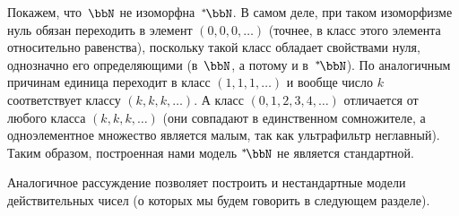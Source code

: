Покажем, что~$\bbN$ не изоморфна~$\nstbb{\bbN}$. В самом деле, при
таком изоморфизме нуль обязан переходить в элемент
$(0,0,0,\dots)$ (точнее, в класс этого элемента относительно
равенства), поскольку такой класс обладает свойствами нуля,
однозначно его определяющими (в~$\bbN$, а потому и
в~$\nstbb{\bbN}$). По аналогичным причинам единица переходит в
класс $(1,1,1,\dots)$ и вообще число $k$ соответствует классу
$(k,k,k,\dots)$. А класс $(0,1,2,3,4,\dots)$ отличается от любого
класса $(k,k,k,\dots)$ (они совпадают в единственном сомножителе,
а одноэлементное множество является малым, так как ультрафильтр
неглавный). Таким образом, построенная нами модель $\nstbb{\bbN}$
не является стандартной.

Аналогичное рассуждение позволяет построить и нестандартные
модели действительных чисел (о которых мы будем говорить в
следующем разделе).
